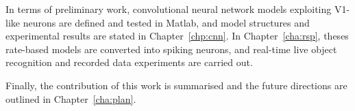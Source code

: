 In terms of preliminary work, convolutional neural network models exploiting V1-like neurons are defined and tested in Matlab, and model structures and experimental results are stated in Chapter~\ref{chp:cnn}.
In Chapter~\ref{cha:rsp}, theses rate-based models are converted into spiking neurons, and real-time live object recognition and recorded data experiments are carried out.

Finally, the contribution of this work is summarised and the future directions are outlined in Chapter~\ref{cha:plan}.
